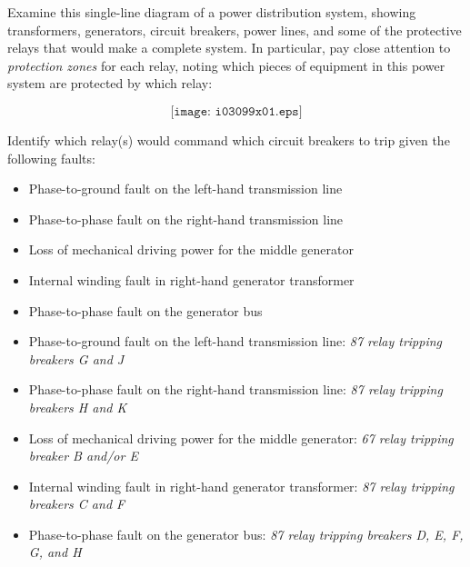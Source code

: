 

Examine this single-line diagram of a power distribution system, showing transformers, generators, circuit breakers, power lines, and some of the protective relays that would make a complete system.  In particular, pay close attention to {\it protection zones} for each relay, noting which pieces of equipment in this power system are protected by which relay:

$$\texttt{[image: i03099x01.eps]}$$

\filbreak

Identify which relay(s) would command which circuit breakers to trip given the following faults:

\begin{itemize}
\item{} Phase-to-ground fault on the left-hand transmission line
\vskip 10pt
\item{} Phase-to-phase fault on the right-hand transmission line
\vskip 10pt
\item{} Loss of mechanical driving power for the middle generator
\vskip 10pt
\item{} Internal winding fault in right-hand generator transformer
\vskip 10pt
\item{} Phase-to-phase fault on the generator bus
\end{itemize}







 






\begin{itemize}
\item{} Phase-to-ground fault on the left-hand transmission line: {\it 87 relay tripping breakers G and J}
\vskip 5pt
\item{} Phase-to-phase fault on the right-hand transmission line: {\it 87 relay tripping breakers H and K}
\vskip 5pt
\item{} Loss of mechanical driving power for the middle generator: {\it 67 relay tripping breaker B and/or E}
\vskip 5pt
\item{} Internal winding fault in right-hand generator transformer: {\it 87 relay tripping breakers C and F}
\vskip 5pt
\item{} Phase-to-phase fault on the generator bus: {\it 87 relay tripping breakers D, E, F, G, and H}
\end{itemize}






